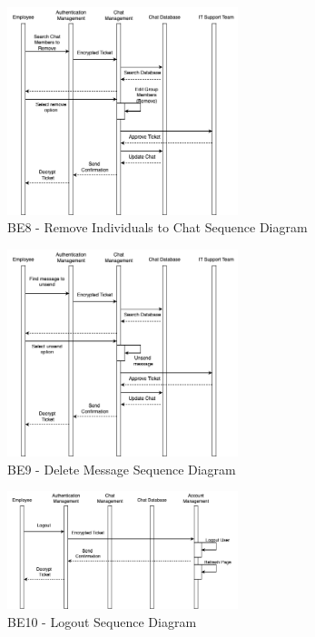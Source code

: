 \documentclass[]{article}
\begin{document}
\begin{figure}[H]
	\centering
	\includegraphics[width=0.6\textwidth]{BE8.png}
	\caption{BE8 - Remove Individuals to Chat Sequence Diagram}
\end{figure}

\begin{figure}[H]
	\centering
	\includegraphics[width=0.6\textwidth]{BE9.png}
	\caption{BE9 - Delete Message Sequence Diagram}
\end{figure}

\begin{figure}[H]
	\centering
	\includegraphics[width=0.6\textwidth]{BE10.png}
	\caption{BE10 - Logout Sequence Diagram}
\end{figure}
\end{document}

